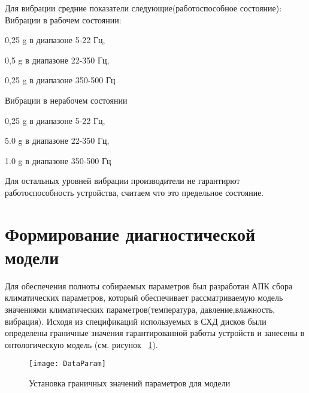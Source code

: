 Для вибрации средние показатели следующие(работоспособное состояние):
Вибрации в рабочем состоянии:
\begin{itemize*}
	\item{0,25 g в диапазоне 5-22 Гц, }
	\item{0,5 g в диапазоне 22-350 Гц,}
	\item{0,25 g в диапазоне 350-500 Гц}
\end{itemize*}
Вибрации в нерабочем состоянии
\begin{itemize*}
	\item{0,25 g в диапазоне 5-22 Гц,}
	\item{5.0  g в диапазоне 22-350 Гц,}
	\item{1.0  g в диапазоне 350-500 Гц}
\end{itemize*}
Для остальных уровней вибрации производители не гарантирют работоспособность устройства, считаем что это предельное состояние.
\section{Формирование диагностической модели}
Для обеспечения полноты собираемых параметров был разработан АПК сбора климатических параметров, который обеспечивает рассматриваемую модель значениями климатических параметров(температура, давление,влажность, вибрация). Исходя из спецификаций используемых в СХД дисков были определены граничные значения гарантированной работы устройств и занесены в онтологическую модель (см. рисунок ~\ref{fig:DataParam}). 

\begin{figure}[h]
	\centering
	\texttt{[image: DataParam]}
	\caption{Установка граничных значений параметров для модели}
	\label{fig:DataParam}
\end{figure}